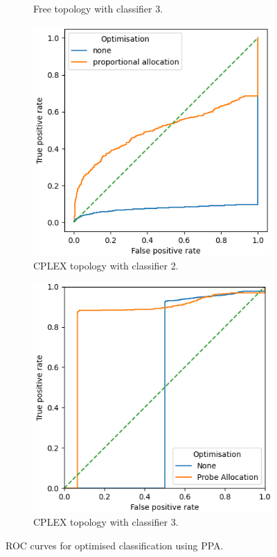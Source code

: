 \begin{figure}[H]
\begin{subfigure}[H]{0.475\textwidth}
        \caption{Free topology with classifier 3.}
    \end{subfigure}
    \begin{subfigure}[H]{0.475\textwidth}
        \includegraphics[width=\textwidth]{figs/results/norway_ac2_opt.png}
        \caption{CPLEX topology with classifier 2.}
    \end{subfigure}
    \begin{subfigure}[H]{0.475\textwidth}
        \includegraphics[width=\textwidth]{figs/results/norway_ac3_opt.png}
        \caption{CPLEX topology with classifier 3.}
    \end{subfigure}
    \caption{ROC curves for optimised classification using PPA.}
    \label{fig:RprobeoptROCcurves}
\end{figure}
